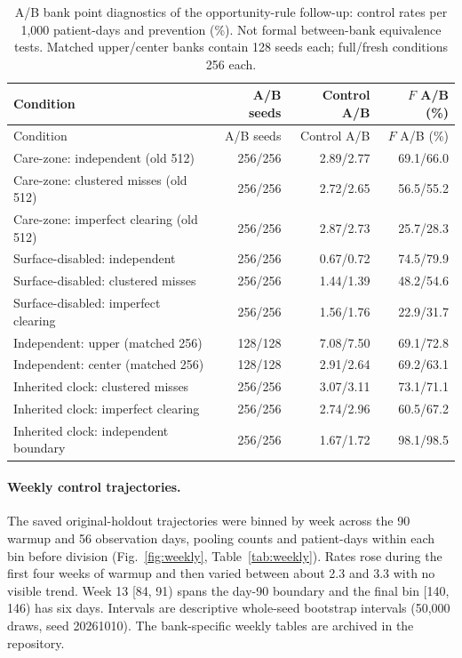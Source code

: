 \documentclass[11pt]{article}
\begin{document}
{\footnotesize\setlength{\tabcolsep}{3pt}
\begin{longtable}{>{\raggedright\arraybackslash}p{.42\linewidth}rrr}
\caption{A/B bank point diagnostics of the opportunity-rule follow-up: control rates per 1,000 patient-days and prevention (\%). Not formal between-bank equivalence tests. Matched upper/center banks contain 128 seeds each; full/fresh conditions 256 each.}\label{tab:banks}\\
\toprule
Condition & A/B seeds & Control A/B & $F$ A/B (\%)\\\midrule\endfirsthead
Condition & A/B seeds & Control A/B & $F$ A/B (\%)\\\midrule\endhead
Care-zone: independent (old 512) & 256/256 & 2.89/2.77 & 69.1/66.0\\
Care-zone: clustered misses (old 512) & 256/256 & 2.72/2.65 & 56.5/55.2\\
Care-zone: imperfect clearing (old 512) & 256/256 & 2.87/2.73 & 25.7/28.3\\
Surface-disabled: independent & 256/256 & 0.67/0.72 & 74.5/79.9\\
Surface-disabled: clustered misses & 256/256 & 1.44/1.39 & 48.2/54.6\\
Surface-disabled: imperfect clearing & 256/256 & 1.56/1.76 & 22.9/31.7\\
Independent: upper (matched 256) & 128/128 & 7.08/7.50 & 69.1/72.8\\
Independent: center (matched 256) & 128/128 & 2.91/2.64 & 69.2/63.1\\
Inherited clock: clustered misses & 256/256 & 3.07/3.11 & 73.1/71.1\\
Inherited clock: imperfect clearing & 256/256 & 2.74/2.96 & 60.5/67.2\\
Inherited clock: independent boundary & 256/256 & 1.67/1.72 & 98.1/98.5\\
\bottomrule\end{longtable}
}

\paragraph{Weekly control trajectories.} The saved original-holdout trajectories
were binned by week across the 90 warmup and 56 observation days, pooling counts
and patient-days within each bin before division (Fig.~\ref{fig:weekly},
Table~\ref{tab:weekly}). Rates rose during the first four weeks of warmup and
then varied between about 2.3 and 3.3 with no visible trend. Week 13 [84, 91)
spans the day-90 boundary and the final bin [140, 146) has six days. Intervals are
descriptive whole-seed bootstrap intervals (50,000 draws, seed 20261010). The
bank-specific weekly tables are archived in the repository.
\end{document}
